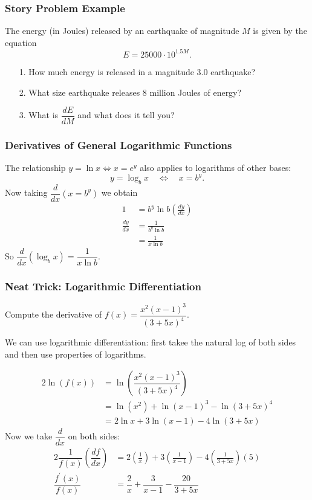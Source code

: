 \documentclass[14pt]{beamer}
\begin{document}
\begin{frame}%
\frametitle{Story Problem Example}
\small
\begin{exe} The energy (in Joules) released by an earthquake of magnitude $M$ is given by the equation
\[E=25000 \cdot 10^{1.5 M}.\]

\vspace{-1pc}
\begin{itemize}
\item[1.] How much energy is released in a magnitude 3.0 earthquake?
\item[2.] What size earthquake releases 8 million Joules of energy?
\item[3.] What is $\dfrac{dE}{dM}$ and what does it tell you?
\end{itemize}
\end{exe}
\end{frame}

\begin{frame}
\frametitle{\small Derivatives of General Logarithmic Functions}
\footnotesize
The relationship $y=\ln x \Longleftrightarrow x=e^y$ also applies to logarithms of other bases:
\[y=\log_b x \quad\Longleftrightarrow\quad x=b^y.\]
Now taking $\dfrac{d}{dx}\left(x=b^y\right)$ we obtain
\begin{align*}
1 &= b^y\ln b\left(\frac{dy}{dx}\right) \\
\frac{dy}{dx} &= \frac{1}{b^y \ln b} \\[0.5pc]
 &=\frac{1}{x \ln b}
\end{align*}
\bigskip
So $\dfrac{d}{dx}(\log_b x)=\dfrac{1}{x \ln b}.$
\end{frame}

\begin{frame}
\frametitle{Neat Trick: Logarithmic Differentiation}
\begin{ex}  Compute the derivative of $f(x)=\dfrac{x^2(x-1)^3}{(3+5x)^4}$. \end{ex}

We can use logarithmic differentiation: first takee the natural log of both sides and then use properties of logarithms.
\end{frame}

\begin{frame}
\small
\begin{alignat*}{2}
\ln(f(x)) &= \ln \left( \dfrac{x^2(x-1)^3}{(3+5x)^4} \right) \\[0.5pc]
&= \ln{(x^2)} + \ln{(x-1)^3}-\ln{(3+5x)^4} \\[0.5pc]
&= 2\ln x + 3\ln(x-1)-4\ln(3+5x)
\end{alignat*}
\alert{Now} we take $\dfrac{d}{dx}$ on both sides:
\begin{alignat*}{2}
\dfrac{1}{f(x)}\left(\dfrac{df}{dx}\right) &= 2\left(\frac{1}{x}\right) + 3\left(\frac{1}{x-1}\right) - 4\left(\frac{1}{3+5x}\right)(5) \\[1pc]
\dfrac{f^{\prime}(x)}{f(x)} &= \dfrac{2}{x} + \dfrac{3}{x-1} - \dfrac{20}{3+5x}
\end{alignat*}
\end{frame}
\end{document}
